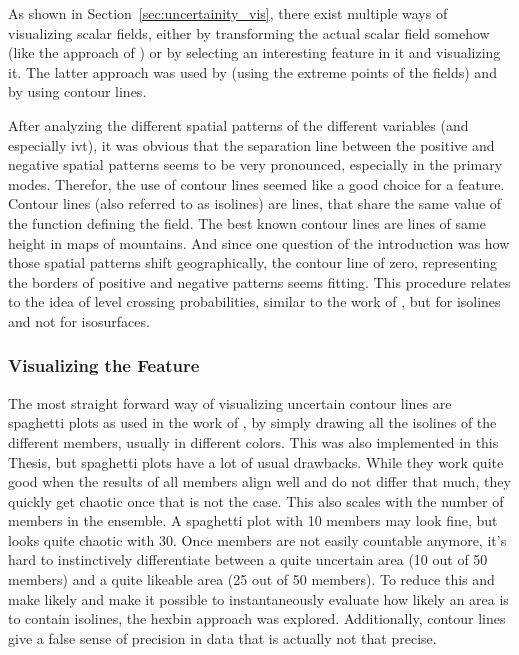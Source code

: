 As shown in Section~\ref{sec:uncertainity_vis}, there exist multiple ways of visualizing scalar fields, either by transforming the actual scalar field somehow (like the approach of ) or by selecting an interesting feature in it and visualizing it. 
The latter approach was used by   (using the extreme points of the fields) and by \cite{sanyal_noodles_2010, whitaker_contour_2013} using contour lines.  

After analyzing the different spatial patterns of the different variables (and especially \ac{ivt}), it was obvious that the separation line between the positive and negative spatial patterns seems to be very pronounced, especially in the primary modes. 
Therefor, the use of contour lines seemed like a good choice for a feature. 
Contour lines (also referred to as isolines) are lines, that share the same value of the function defining the field. The best known contour lines are lines of same height in maps of mountains.  
And since one question of the introduction was how those spatial patterns shift geographically, the contour line of zero, representing the borders of positive and negative patterns seems fitting. 
This procedure relates to the idea of level crossing probabilities, similar to the work of , but for isolines and not for isosurfaces.

\subsubsection{Visualizing the Feature}

The most straight forward way of visualizing uncertain  contour lines are spaghetti plots as used in the work of , by simply drawing all the isolines of the different members, usually in different colors. 
This was also implemented in this Thesis, but spaghetti plots have a lot of usual drawbacks. 
While they work quite good when the results of all members align well and do not differ that much, they quickly get chaotic once that is not the case. 
This also scales with the number of members in the ensemble. 
A spaghetti plot with 10 members may look fine, but looks quite chaotic with 30. 
Once members are not easily countable anymore, it's hard to instinctively differentiate between a quite uncertain area (10 out of 50 members) and a quite likeable area (25 out of 50 members). 
To reduce this and make likely and make it possible to instantaneously evaluate how likely an area is to contain isolines, the hexbin approach was explored.
Additionally, contour lines give a false sense of precision in data that is actually not that precise. 

